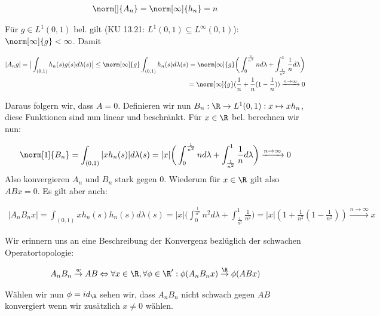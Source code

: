 \begin{solution}
\begin{align*}
  \norm[]{A_n} = \norm[\infty]{h_n} = n
\end{align*}

Für $g \in L^1(0,1)$ bel. gilt (KU 13.21: $L^1(0,1) \subseteq L^{\infty}(0,1)$):
$\norm[\infty]{g} < \infty$. Damit

\begin{align*}
  |A_n g| =
  \big| \int_{(0,1)}h_n(s) g(s)d\lambda(s) \big|
  \leq \norm[\infty]{g} \int_{(0,1)} h_n(s) d\lambda(s)
  =\norm[\infty]{g}
  \bigg( \int_0^\frac{1}{n^2} n d\lambda + \int_\frac{1}{n^2}^1 \frac{1}{n} d\lambda
  \bigg) \\
  = \norm[\infty]{g} (\frac{1}{n}+\frac{1}{n}(1-\frac{1}{n}))
  \xrightarrow{n \rightarrow \infty} 0
\end{align*}

Daraus folgern wir, dass $A=0$. Definieren wir nun
$B_n: \R \rightarrow L^1(0,1): x \mapsto xh_n$, diese Funktionen sind nun linear und
beschränkt. Für $x \in \R$ bel. berechnen wir nun:

\begin{align*}
  \norm[1]{B_n} = \int_{(0,1)} |xh_n(s)|d\lambda(s) = |x|
  \bigg( \int_0^\frac{1}{n^2} n d\lambda + \int_\frac{1}{n^2}^1 \frac{1}{n} d\lambda
  \bigg)
  \xrightarrow{n \rightarrow \infty} 0
\end{align*}
Also konvergieren $A_n$ und $B_n$ stark gegen 0. Wiederum für $x \in \R$ gilt also
$ABx = 0$. Es gilt aber auch:

\begin{align*}
  |A_n B_n x| =
  \int_{(0,1)} x h_n(s) h_n(s) d\lambda(s) = |x|
  \bigg(\int_0^\frac{1}{n^2} n^2 d\lambda + \int_\frac{1}{n^2}^1 \frac{1}{n^2}
  \bigg)
  = |x|(1+\frac{1}{n^2}(1-\frac{1}{n^2}))
  \xrightarrow{n \rightarrow \infty} x
\end{align*}

Wir erinnern uns an eine Beschreibung der Konvergenz bezlüglich der schwachen Operatortopologie:

\begin{align*}
  A_n B_n \stackrel{w}{\rightarrow} AB \Leftrightarrow
  \forall x \in \R, \forall \phi \in \R':
  \phi(A_n B_n x) \stackrel{\R}{\rightarrow} \phi(ABx)
\end{align*}

Wählen wir nun $\phi=id_\R$ sehen wir, dass $A_n B_n$ nicht schwach gegen $AB$ konvergiert
wenn wir zusätzlich $x \neq 0$ wählen.
\end{solution}
